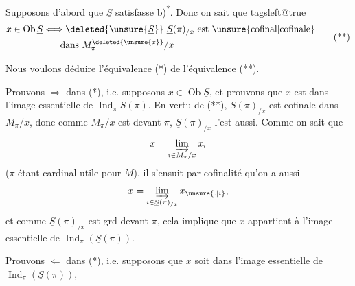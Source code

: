 
Supposons d'abord que $\underline S$ satisfasse b)\textsuperscript{*}. Donc on sait que
\begingroup\csname tagsleft@true\endcsname
\[
\begin{aligned}
x\in\operatorname{Ob}\underline S
  &\Longleftrightarrow \deleted{\unsure{\underline S}}\ \underline S(\pi)_{/x}\ \text{est \unsure{cofinal|cofinale}}\\
  &\hphantom{\Longleftrightarrow}\text{dans }M_{\pi}^{\deleted{\unsure{x}}}/x
\end{aligned}
\tag*{(**)}
\]
\endgroup

Nous voulons déduire l'équivalence (*) de l'équivalence (**).

Prouvons $\Rightarrow$ dans (*), i.e. supposons $x\in\operatorname{Ob}\underline S$, et prouvons que $x$ est dans l'image essentielle de $\operatorname{Ind}_{\pi}\underline S(\pi)$. En vertu de (**), $\underline S(\pi)_{/x}$ est  cofinale dans $M_{\pi}/x$, donc comme $M_{\pi}/x$ est  devant $\pi$, $\underline S(\pi)_{/x}$ l'est aussi.  Comme on sait que
\[
x=\varinjlim_{i\in M_{\pi}/x}x_i
\]
($\pi$ étant cardinal utile pour $M$), il s'ensuit  par cofinalité qu'on a aussi
\[
x=\varinjlim_{i\in\underline S(\pi)_{/x}}x_{\unsure{.|i}}, 
\]
et comme $\underline S(\pi)_{/x}$ est grd devant $\pi$, cela implique que $x$ appartient à l'image essentielle de $\operatorname{Ind}_{\pi}(\underline S(\pi))$.

Prouvons $\Leftarrow$ dans (*), i.e. supposons que $x$ soit dans l'image essentielle de $\operatorname{Ind}_{\pi}(\underline S(\pi))$,
